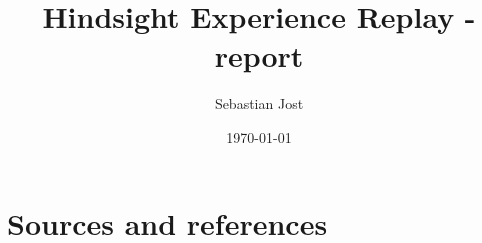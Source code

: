 \documentclass[DIV=13,10pt]{scrartcl}
\title{Hindsight Experience Replay - report}
\author{Sebastian Jost}
\date{\today}
\begin{document}
\sffamily


\tableofcontents
\newpage

% 

% 

\pagebreak[4]

\section{Sources and references}
\printbibliography
\end{document}
